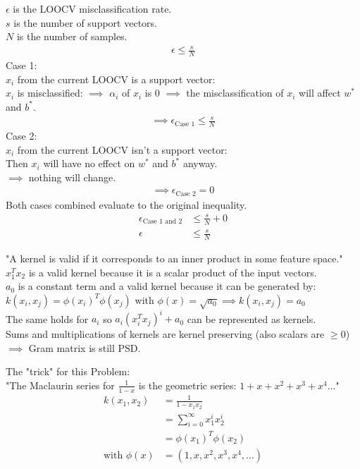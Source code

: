 \begin{flushleft}
$\epsilon$ is the LOOCV misclassification rate.\\
$s$ is the number of support vectors.\\
$N$ is the number of samples.
\begin{align*}
\epsilon \leq \frac{s}{N}
\end{align*}
Case 1: \\
$x_i$ from the current LOOCV is a support vector: \\
$x_i$ is misclassified: $\implies$ $\alpha_i$ of $x_i$ is $0$ $\implies$
the misclassification of $x_i$ will affect $w^*$ and $b^*$.
\begin{align*}
\implies \epsilon_{\text{Case 1}} \leq \frac{s}{N}
\end{align*}
Case 2: \\
$x_i$ from the current LOOCV isn't a support vector: \\
Then $x_i$ will have no effect on $w^*$ and $b^*$ anyway.\\
$\implies$ nothing will change.
\begin{align*}
\implies \epsilon_{\text{Case 2}} = 0
\end{align*}
Both cases combined evaluate to the original inequality.
\begin{align*}
\epsilon_{\text{Case 1 and 2}} &\leq \frac{s}{N} + 0\\
\epsilon &\leq \frac{s}{N}
\end{align*}
\end{flushleft}
%
%
%
\begin{flushleft}
"A kernel is valid if it corresponds to an inner product in some feature space."\\
$x_{1}^{T}x_{2}$ is a valid kernel because it is a scalar product of the input vectors.\\
$a_{0}$ is a constant term and a valid kernel because it can be generated by:\\
$k(x_i,x_j) = \phi(x_i)^T\phi(x_j)$ with $\phi(x) = \sqrt{a_0} \implies k(x_i,x_j) = a_0$\\
The same holds for $a_i$ so $a_i(x_i^T x_j)^i + a_0$ can be represented as kernels.\\
Sums and multiplications of kernels are kernel preserving (also scalars are $\geq 0$)\\
$\implies$ Gram matrix is still PSD.
\end{flushleft}
%
%
%
\begin{flushleft}
The "trick" for this Problem:\\
"The Maclaurin series for $\frac{1}{1-x}$ is the geometric series:
$1 + x + x^2 + x^3 + x^4 ...$"
\begin{align*}
k(x_1,x_2)&=\frac{1}{1-x_1 x_2}\\
&= \sum_{i=0}^{\infty}x_1^i x_2^i\\
&= \phi(x_1)^T \phi(x_2)\\
\text{with } \phi(x)&=(1,x,x^2,x^3,x^4, ...)
\end{align*}
\end{flushleft}
